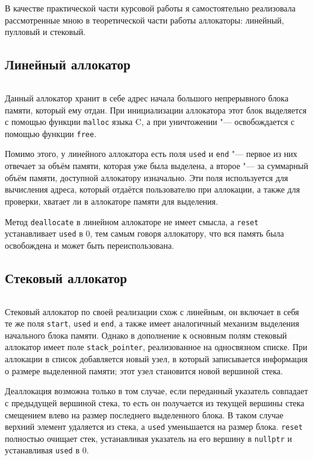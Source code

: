 В качестве практической части курсовой работы я самостоятельно реализовала рассмотренные мною в теоретической части работы аллокаторы: линейный, пулловый и стековый.

\subsection{Линейный аллокатор}
\inputminted{cpp}{linear_allocator.h}

Данный аллокатор хранит в себе адрес начала большого непрерывного блока памяти, который ему отдан. При инициализации аллокатора этот блок выделяется с помощью функции \texttt{malloc} языка C, а при уничтожении "--- освобождается с помощью функции \texttt{free}.

Помимо этого, у линейного аллокатора есть поля \texttt{used} и \texttt{end} "--- первое из них отвечает за объём памяти, которая уже была выделена, а второе "--- за суммарный объём памяти, доступной аллокатору изначально. Эти поля используется для вычисления адреса, который отдаётся пользователю при аллокации, а также для проверки, хватает ли в аллокаторе памяти для выделения.

Метод \texttt{deallocate} в линейном аллокаторе не имеет смысла, а \texttt{reset} устанавливает \texttt{used} в $0$, тем самым говоря аллокатору, что вся память была освобождена и может быть переиспользована.

\subsection{Стековый аллокатор}
\inputminted{cpp}{stack_allocator.h}

Стековый аллокатор по своей реализации схож с линейным, он включает в себя те же поля \texttt{start}, \texttt{used} и \texttt{end}, а также имеет аналогичный механизм выделения начального блока памяти. Однако в дополнение к основным полям стековый аллокатор имеет поле \texttt{stack_pointer}, реализованное на односвязном списке. При аллокации в список добавляется новый узел, в который записывается информация о размере выделенной памяти; этот узел становится новой вершиной стека.

Деаллокация возможна только в том случае, если переданный указатель совпадает с предыдущей вершиной стека, то есть он получается из текущей вершины стека смещением влево на размер последнего выделенного блока. В таком случае верхний элемент удаляется из стека, а \texttt{used} уменьшается на размер блока. \texttt{reset} полностью очищает стек, устанавливая указатель на его вершину в \texttt{nullptr} и устанавливая \texttt{used} в $0$.

